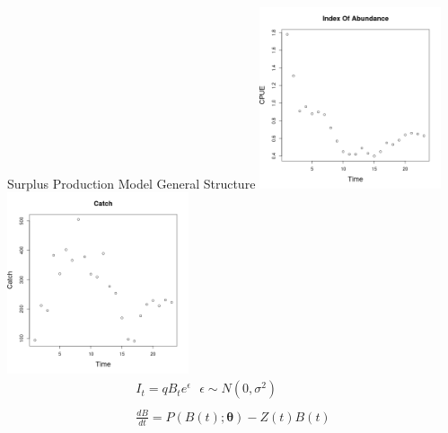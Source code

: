 \documentclass[ xcolor = pdftex, dvipsnames, table ]{beamer}
\begin{document}
%
\begin{frame}{Surplus Production Model General Structure}
	\centering 
	\includegraphics[width=0.4\textwidth]{../plots/hakeIndex.png}
	\includegraphics[width=0.4\textwidth]{../plots/hakeCatch.png}
        \begin{align*}
	I_t = q B_t e^\epsilon ~~~ \epsilon\sim N(0, \sigma^2) \label{resp}\\
	~\\
	\frac{dB}{dt} = P(B(t); \bm{\theta}) - Z(t)B(t)
	\end{align*}
	
\end{frame}
\end{document}
